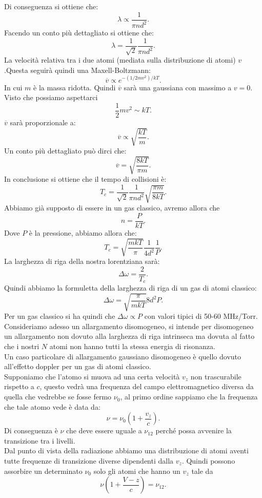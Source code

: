 Di conseguenza si ottiene che:
\[
    \lambda  \propto \frac{1}{\pi nd^2}
.\] 
Facendo un conto più dettagliato si ottiene che:
\[
    \lambda  = \frac{1}{\sqrt{2}}\frac{1}{\pi nd^2}
.\] 
La velocità relativa tra i due atomi (mediata sulla distribuzione di atomi) $v$.Questa seguirà quindi una Maxell-Boltzmann:
\[
    \overline{v} \propto e^{-(1 /2mv^2)/kT} 
.\] 
In cui $m$ è la massa ridotta. Quindi $\overline{v}$ sarà una gaussiana con massimo a $v = 0$. Visto che possiamo aspettarci 
\[
    \frac{1}{2}mv^2 \sim kT
.\] 
$\overline{v}$  sarà proporzionale a:
\[
    \overline{v} \propto \sqrt{\frac{kT}{m}} 
.\] 
Un conto più dettagliato può dirci che:
\[
    \overline{v} = \sqrt{\frac{8kT}{\pi m}} 
.\] 
In conclusione si ottiene che il tempo di collisioni è:
\[
    T_c = \frac{1}{\sqrt{2}}\frac{1}{\pi n d^2}
    \sqrt{\frac{\pi m}{8kT}} 
.\] 
Abbiamo già supposto di essere in un gas classico, avremo allora che 
\[
    n = \frac{P}{kT}
.\] 
Dove $P$ è la pressione, abbiamo allora che:
\[
    T_c = \sqrt{\frac{mkT}{\pi}} \frac{1}{4d^2}\frac{1}{P}
.\] 
La larghezza di riga della nostra lorentziana sarà:
\[
    \Delta\omega =\frac{2}{T_c}
.\] 
Quindi abbiamo la formuletta della larghezza di riga di un gas di atomi classico:
\[
    \Delta\omega  = \sqrt{\frac{\pi}{ mkT}} 8d^2P
.\] 
Per un gas classico si ha quindi che $\Delta\omega\propto P$  con valori tipici di 50-60 MHz/Torr.\\
Consideriamo adesso un allargamento disomogeneo, si intende per disomogeneo un allargamento non dovuto alla larghezza di riga intrinseca ma dovuta al fatto che i nostri $N$  atomi non hanno tutti la stessa energia di risonanza.\\
Un caso particolare di allargamento gaussiano disomogeneo è quello dovuto all'effetto doppler per un gas di atomi classico.\\
Supponiamo che l'atomo si muova ad una certa velocità $v_z$  non trascurabile rispetto a $c$, questo vedrà una frequenza del campo elettromagnetico diversa da quella che vedrebbe se fosse fermo $\nu_0$, al primo ordine sappiamo che la frequenza che tale atomo vede è data da:
\[
    \nu  = \nu_0\left(1+\frac{v_z}{c}\right)
.\] 
Di conseguenza è $\nu$ che deve essere uguale a $\nu_{12}$  perché possa avvenire la transizione tra i livelli.\\
Dal punto di vista della radiazione abbiamo una distribuzione di atomi aventi tutte frequenze di transizione diverse dipendenti dalla $v_z$. Quindi possono assorbire un determinato $\nu_0 $ solo gli atomi che hanno un $v_z$  tale da
\[
    \nu\left(1+\frac{V-z}{c}\right) = \nu_{12}
.\] 
